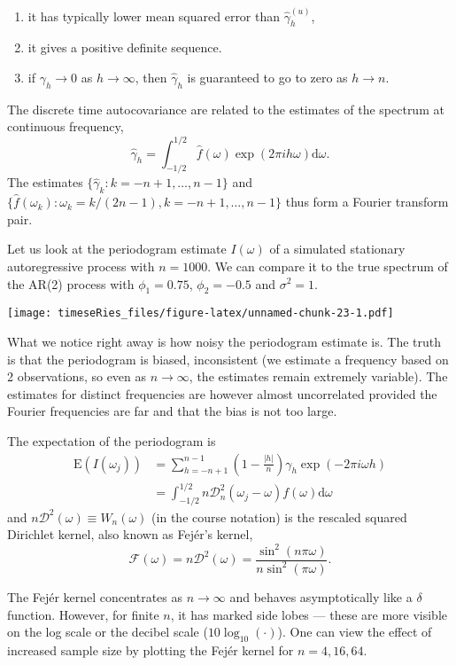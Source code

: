 \documentclass[]{book}
\providecommand{\tightlist}{%
  \setlength{\itemsep}{0pt}\setlength{\parskip}{0pt}}
\begin{document}
\begin{enumerate}
\def\labelenumi{\arabic{enumi}.}
\tightlist
\item
  it has typically lower mean squared error than
  \(\widehat{\gamma}_h^{(u)}\),
\item
  it gives a positive definite sequence.
\item
  if \(\gamma_h \to 0\) as \(h \to \infty\), then \(\widehat{\gamma}_h\)
  is guaranteed to go to zero as \(h \rightarrow n\).
\end{enumerate}

The discrete time autocovariance are related to the estimates of the
spectrum at continuous frequency,
\[\widehat{\gamma}_h = \int_{-1/2}^{1/2} \widehat{f}(\omega)\exp(2\pi i h\omega) \mathrm{d} \omega.\]
The estimates \(\{\widehat{\gamma}_k: k = -n+1, \ldots, n-1\}\) and
\(\{\widehat{f}(\omega_k): \omega_k = k/(2n-1), k=-n+1, \ldots, n-1\}\)
thus form a Fourier transform pair.

Let us look at the periodogram estimate \(I(\omega)\) of a simulated
stationary autoregressive process with \(n=1000\). We can compare it to
the true spectrum of the AR(2) process with \(\phi_1=0.75\),
\(\phi_2=-0.5\) and \(\sigma^2=1\).

\texttt{[image: timeseRies\_files/figure-latex/unnamed-chunk-23-1.pdf]}

What we notice right away is how noisy the periodogram estimate is. The
truth is that the periodogram is biased, inconsistent (we estimate a
frequency based on 2 observations, so even as \(n \rightarrow \infty\),
the estimates remain extremely variable). The estimates for distinct
frequencies are however almost uncorrelated provided the Fourier
frequencies are far and that the bias is not too large.

The expectation of the periodogram is \[
\begin{align*}\mathrm{E}\left(I(\omega_j)\right) &= \sum_{h = -n+1}^{n-1} \left(1-\frac{|h|}{n}\right)\gamma_h\exp(-2\pi i \omega h)
\\&= \int_{-1/2}^{1/2}n\mathcal{D}_n^2(\omega_j-\omega)f(\omega)\mathrm{d} \omega
\end{align*}
\] and \(n\mathcal{D}^2(\omega)\equiv W_n(\omega)\) (in the course
notation) is the rescaled squared Dirichlet kernel, also known as
Fejér's kernel,
\[\mathcal{F}(\omega)=n\mathcal{D}^2(\omega) = \frac{\sin^2(n \pi \omega)}{n\sin^2(\pi\omega)}.\]

The Fejér kernel concentrates as \(n \rightarrow \infty\) and behaves
asymptotically like a \(\delta\) function. However, for finite \(n\), it
has marked side lobes --- these are more visible on the log scale or the
decibel scale (\(10\log_{10}(\cdot)\)). One can view the effect of
increased sample size by plotting the Fejér kernel for \(n=4, 16, 64\).
\end{document}
